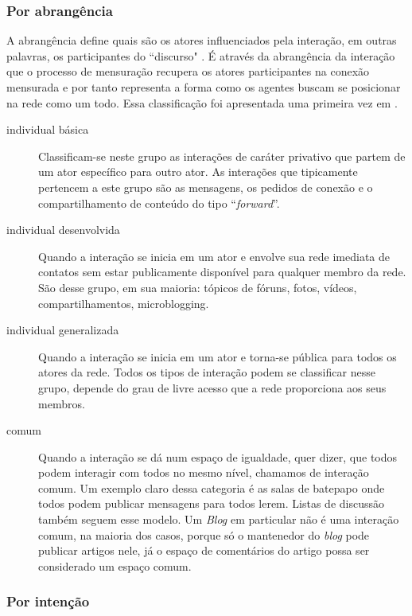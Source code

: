 \documentclass{article}
\begin{document}
\subsubsection{Por abrangência}

A abrangência define quais são os atores influenciados pela interação, em
outras palavras, os participantes do ``discurso" \cite{Dooley2001}. É através da
abrangência da interação que o processo de mensuração recupera os atores
participantes na conexão mensurada e por tanto representa a forma como os
agentes buscam se posicionar na rede como um todo. Essa classificação foi
apresentada uma primeira vez em \cite{MARTINEZ2000}.
\begin{description}
\item[individual básica] Classificam-se neste grupo as interações de caráter
privativo que partem de um ator específico para outro ator. As interações que
tipicamente pertencem a este grupo são as mensagens, os pedidos de conexão e o
compartilhamento de conteúdo do tipo ``\textit{forward}''.
\item[individual desenvolvida] Quando a interação se inicia em um ator e envolve
sua rede imediata de contatos sem estar publicamente disponível para qualquer
membro da rede. São desse grupo, em sua maioria: tópicos de fóruns, fotos,
vídeos, compartilhamentos, microblogging.
\item[individual generalizada] Quando a interação se inicia em um ator e
torna-se pública para todos os atores da rede. Todos os tipos de interação podem
se classificar nesse grupo, depende do grau de livre acesso que a rede
proporciona aos seus membros.
\item[comum] Quando a interação se dá num espaço de igualdade, quer dizer, que
todos podem interagir com todos no mesmo nível, chamamos de interação comum. Um
exemplo claro dessa categoria é as salas de batepapo onde todos podem publicar
mensagens para todos lerem. Listas de discussão também seguem esse modelo.
Um \textit{Blog} em particular não é uma interação comum, na maioria dos casos,
porque só o mantenedor do \textit{blog} pode publicar artigos nele, já o
espaço de comentários do artigo possa ser considerado um espaço comum.
\end{description}

\subsubsection{Por intenção}
\end{document}
